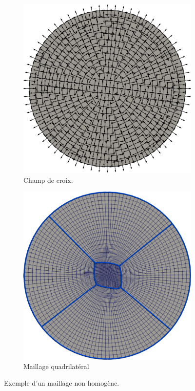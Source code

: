 \begin{figure}[h!]
\centering
\begin{subfigure}{0.49\textwidth}
    \includegraphics[width=\textwidth]{images/non_homo_cross_field.pdf}
    \caption{Champ de croix.}
    \label{fig:non_homogene_cross_field}
\end{subfigure}
\hfill
\begin{subfigure}{0.46\textwidth}
    \includegraphics[width=\textwidth]{images/non_homo_mesh_quad.pdf}
    \caption{Maillage quadrilatéral}
    \label{fig:non_homogene_mesh_quad}
\end{subfigure}
\caption{Exemple d'un maillage non homogène.}
\label{fig:non_homogene}
\end{figure}




